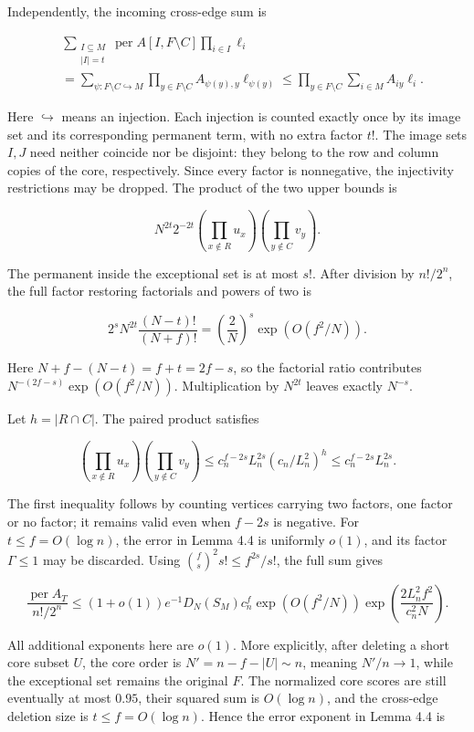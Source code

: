 \documentclass[11pt,a4paper]{article}
\begin{document}
Independently, the incoming cross-edge sum is

\[
\begin{aligned}
&\sum_{\substack{I\subseteq M\\|I|=t}}
\operatorname{per}A[I,F\setminus C]\prod_{i\in I}\ell_i\\
&=\sum_{\psi:F\setminus C\hookrightarrow M}
\prod_{y\in F\setminus C}A_{\psi(y),y}\ell_{\psi(y)}
\le\prod_{y\in F\setminus C}\sum_{i\in M}A_{iy}\ell_i.
\end{aligned}
\]

Here \(\hookrightarrow\) means an injection. Each injection is counted exactly once by its image set and its corresponding permanent term, with no extra factor \(t!\). The image sets \(I,J\) need neither coincide nor be disjoint: they belong to the row and column copies of the core, respectively. Since every factor is nonnegative, the injectivity restrictions may be dropped. The product of the two upper bounds is

\[
N^{2t}2^{-2t}
\left(\prod_{x\notin R}u_x\right)
\left(\prod_{y\notin C}v_y\right).
\]

The permanent inside the exceptional set is at most \(s!\). After division by \(n!/2^n\), the full factor restoring factorials and powers of two is

\[
2^sN^{2t}\frac{(N-t)!}{(N+f)!}
=\left(\frac2N\right)^s\exp(O(f^2/N)).
\]

Here \(N+f-(N-t)=f+t=2f-s\), so the factorial ratio contributes \(N^{-(2f-s)}\exp(O(f^2/N))\). Multiplication by \(N^{2t}\) leaves exactly \(N^{-s}\).

Let \(h=|R\cap C|\). The paired product satisfies

\[
\left(\prod_{x\notin R}u_x\right)
\left(\prod_{y\notin C}v_y\right)
\le c_n^{f-2s}L_n^{2s}(c_n/L_n^2)^h
\le c_n^{f-2s}L_n^{2s}.
\]

The first inequality follows by counting vertices carrying two factors, one factor or no factor; it remains valid even when \(f-2s\) is negative. For \(t\le f=O(\log n)\), the error in Lemma 4.4 is uniformly \(o(1)\), and its factor \(\Gamma\le1\) may be discarded. Using \(\binom fs^2s!\le f^{2s}/s!\), the full sum gives

\[
\frac{\operatorname{per}A_T}{n!/2^n}
\le(1+o(1))e^{-1}D_N(S_M)c_n^f
\exp(O(f^2/N))
\exp\left(\frac{2L_n^2f^2}{c_n^2N}\right).
\]

All additional exponents here are \(o(1)\). More explicitly, after deleting a short core subset \(U\), the core order is \(N'=n-f-|U|\sim n\), meaning \(N'/n\to1\), while the exceptional set remains the original \(F\). The normalized core scores are still eventually at most \(0.95\), their squared sum is \(O(\log n)\), and the cross-edge deletion size is \(t\le f=O(\log n)\). Hence the error exponent in Lemma 4.4 is
\end{document}
